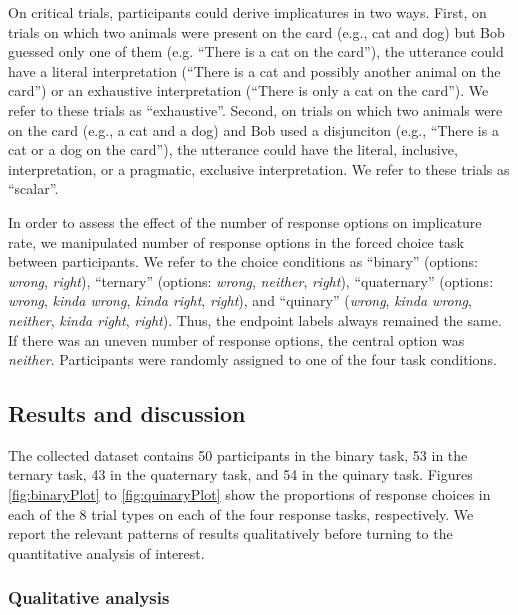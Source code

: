 \documentclass[man]{apa6}
\theoremstyle{definition}
\theoremstyle{definition}
\theoremstyle{definition}
\theoremstyle{remark}
\begin{document}
On critical trials, participants could derive implicatures in two ways.
First, on trials on which two animals were present on the card (e.g.,
cat and dog) but Bob guessed only one of them (e.g. \enquote{There is a
cat on the card}), the utterance could have a literal interpretation
(\enquote{There is a cat and possibly another animal on the card}) or an
exhaustive interpretation (\enquote{There is only a cat on the card}).
We refer to these trials as \enquote{exhaustive}. Second, on trials on
which two animals were on the card (e.g., a cat and a dog) and Bob used
a disjunciton (e.g., \enquote{There is a cat or a dog on the card}), the
utterance could have the literal, inclusive, interpretation, or a
pragmatic, exclusive interpretation. We refer to these trials as
\enquote{scalar}.

In order to assess the effect of the number of response options on
implicature rate, we manipulated number of response options in the
forced choice task between participants. We refer to the choice
conditions as \enquote{binary} (options: \emph{wrong}, \emph{right}),
\enquote{ternary} (options: \emph{wrong}, \emph{neither}, \emph{right}),
\enquote{quaternary} (options: \emph{wrong}, \emph{kinda wrong},
\emph{kinda right}, \emph{right}), and \enquote{quinary} (\emph{wrong},
\emph{kinda wrong}, \emph{neither}, \emph{kinda right}, \emph{right}).
Thus, the endpoint labels always remained the same. If there was an
uneven number of response options, the central option was
\emph{neither}. Participants were randomly assigned to one of the four
task conditions.

\subsection{Results and discussion}\label{results-and-discussion}

The collected dataset contains 50 participants in the binary task, 53 in
the ternary task, 43 in the quaternary task, and 54 in the quinary task.
Figures \ref{fig:binaryPlot} to \ref{fig:quinaryPlot} show the
proportions of response choices in each of the 8 trial types on each of
the four response tasks, respectively. We report the relevant patterns
of results qualitatively before turning to the quantitative analysis of
interest.

\subsubsection{Qualitative analysis}\label{qualitative-analysis}
\end{document}
